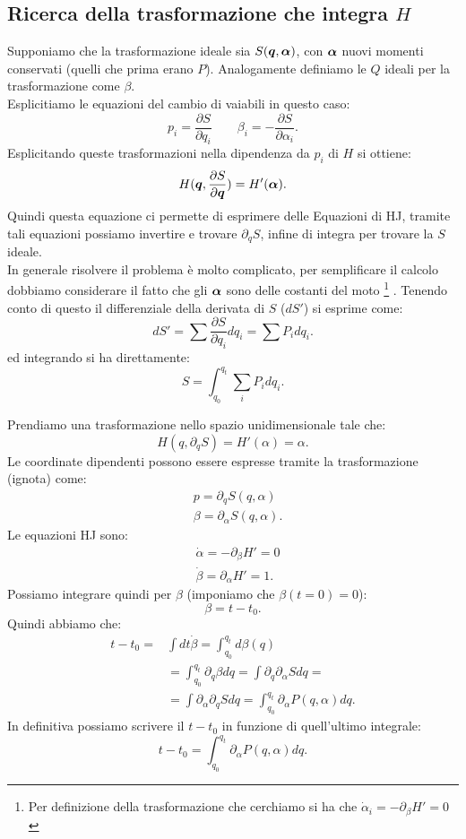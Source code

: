 \subsection{Ricerca della trasformazione che integra $H$}%
\label{sub:Ricerca della trasformazione per integrare H}
Supponiamo che la trasformazione ideale sia $S(\boldsymbol{q}, \boldsymbol{\alpha})$, con $\boldsymbol{\alpha}$ nuovi momenti conservati (quelli che prima erano $P$). Analogamente definiamo le $Q$ ideali per la trasformazione come $\beta$.\\
Esplicitiamo le equazioni del cambio di vaiabili in questo caso:
\[
    p_i = \frac{\partial S}{\partial q_i} \qquad \beta_i = - \frac{\partial S}{\partial \alpha_i} 
.\] 
Esplicitando queste trasformazioni nella dipendenza da $p_i$ di $H$ si ottiene:
\[
    H(\boldsymbol{q}, \frac{\partial S}{\partial \boldsymbol{q}}) = H'(\boldsymbol{\alpha}) 
.\] 
Quindi questa equazione ci permette di esprimere delle Equazioni di HJ, tramite tali equazioni possiamo invertire e trovare $\partial_{q}S$, infine di integra per trovare la $S$ ideale.\\
In generale risolvere il problema è molto complicato, per semplificare il calcolo dobbiamo considerare il fatto che gli $\boldsymbol{\alpha}$ sono delle costanti del moto
\footnote{Per definizione della trasformazione che cerchiamo si ha che $\dot{\alpha}_i = -\partial_{\beta}H' = 0$ }
. Tenendo conto di questo il differenziale della derivata di $S$ ($dS'$) si esprime come:
\[
    dS' = \sum_{}^{} \frac{\partial S}{\partial q_i} dq_i = \sum_{}^{} P_idq_i
.\] 
ed integrando si ha direttamente:
\[
    S = \int_{q_0}^{q_t} \sum_{i}^{} P_idq_i 
.\] 
\begin{exmp}[Hamiltoniana 1D]
    Prendiamo una trasformazione nello spazio unidimensionale tale che:
    \[
	H(q,\partial_{q}S) = H'(\alpha) = \alpha
    .\] 
    Le coordinate dipendenti possono essere espresse tramite la trasformazione (ignota) come:
    \[\begin{aligned}
	& p = \partial_{q}S(q, \alpha) \\
	& \beta  = \partial_{\alpha}S(q, \alpha) 
    .\end{aligned}\]
    Le equazioni HJ sono:
    \[\begin{aligned}
	&\dot{\alpha}= - \partial_{\beta} H' = 0\\
	&\dot{\beta} = \partial_{\alpha}H' = 1
    .\end{aligned}\]
    Possiamo integrare quindi per $\beta$ (imponiamo che $\beta (t=0) =0$):
    \[
        \beta  = t-t_0
    .\] 
    Quindi abbiamo che:
    \[\begin{aligned}
	t-t_0 =& \int dt \dot{\beta} 
	       = \int_{q_0}^{q_t} d\beta (q) \\
	       & = \int_{q_0}^{q_t} \partial_{q}\beta dq 
	       = \int  \partial_{q}\partial_{\alpha}S dq = \\
	       & = \int\partial_{\alpha }\partial_{q}Sdq
	       = \int_{q_0}^{q_t} \partial_{\alpha}P(q, \alpha) dq 
    .\end{aligned}\]
    In definitiva possiamo scrivere il $t-t_0$ in funzione di quell'ultimo integrale:
    \[
        t-t_0 = \int_{q_0}^{q_t} \partial_{\alpha}P(q, \alpha) dq 
    .\] 
\end{exmp}

